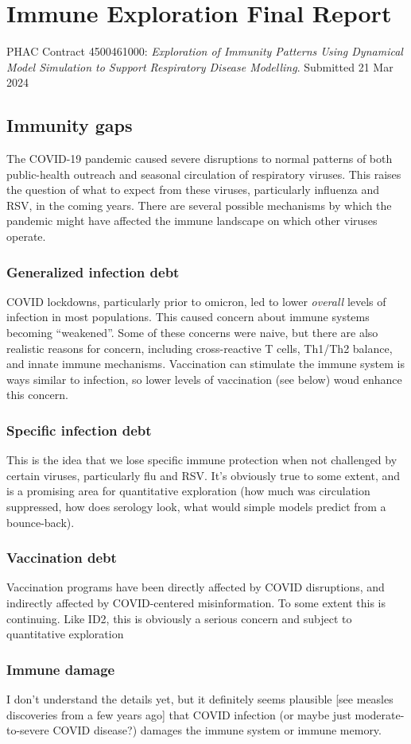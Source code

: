 \documentclass[12pt]{article}
\newcommand{\head}{\subsection*}
\newcommand{\sub}{\subsubsection*}
\begin{document}
\section*{Immune Exploration Final Report}

PHAC Contract 4500461000: \emph{Exploration of Immunity Patterns Using Dynamical
Model Simulation to Support Respiratory Disease
Modelling}. Submitted 21 Mar 2024

\head{Immunity gaps}

The COVID-19 pandemic caused severe disruptions to normal patterns of both public-health outreach and seasonal circulation of respiratory viruses. This raises the question of what to expect from these viruses, particularly influenza and RSV, in the coming years. There are several possible mechanisms by which the pandemic might have affected the immune landscape on which other viruses operate.

\sub{Generalized infection debt}

COVID lockdowns, particularly prior to omicron, led to lower \emph{overall} levels of infection in most populations. This caused concern about immune systems becoming “weakened”. Some of these concerns were naive, but there are also realistic reasons for concern, including cross-reactive T cells, Th1/Th2 balance, and innate immune mechanisms. Vaccination can stimulate the immune system is ways similar to infection, so lower levels of vaccination (see below) woud enhance this concern.

\sub{Specific infection debt}

This is the idea that we lose specific immune protection when not challenged by certain viruses, particularly flu and RSV. It's obviously true to some extent, and is a promising area for quantitative exploration (how much was circulation suppressed, how does serology look, what would simple models predict from a bounce-back).

\sub{Vaccination debt}

Vaccination programs have been directly affected by COVID disruptions, and indirectly affected by COVID-centered misinformation. To some extent this is continuing. Like ID2, this is obviously a serious concern and subject to quantitative exploration

\sub{Immune damage}

I don't understand the details yet, but it definitely seems plausible [see measles discoveries from a few years ago] that COVID infection (or maybe just moderate-to-severe COVID disease?) damages the immune system or immune memory.
\end{document}
